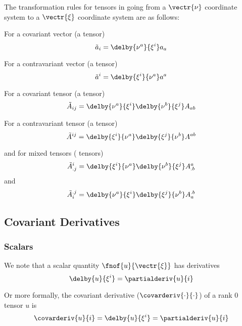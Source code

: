 The transformation rules for tensors in going from a $\vectr{\nu}$ coordinate
system to a $\vectr{\xi}$ coordinate system are as follows: 


For a covariant vector (a  tensor)
\begin{equation}
  {\tilde{a}}_{i}=\delby{\nu^{a}}{\xi^{i}}a_{a}
\end{equation}

For a contravariant vector (a  tensor)
\begin{equation}
  {\tilde{a}}^{i}=\delby{\xi^{i}}{\nu^{a}}a^{a}
\end{equation}

For a covariant tensor (a  tensor)
\begin{equation}
  {\tilde{A}}_{ij}=\delby{\nu^{a}}{\xi^{i}}\delby{\nu^{b}}{\xi^{j}}A_{ab} 
\end{equation}

For a contravariant tensor (a  tensor)
\begin{equation}
  {\tilde{A}}^{ij}=\delby{\xi^{i}}{\nu^{a}}\delby{\xi^{j}}{\nu^{b}}A^{ab}
\end{equation}

and for mixed tensors ( tensors)
\begin{equation}
  {\tilde{A}}^{i}_{.j}=\delby{\xi^{i}}{\nu^{a}}\delby{\nu^{b}}{\xi^{j}}A^{a}_{.b}
\end{equation}
and
\begin{equation}
  {\tilde{A}}_{i}^{.j}=\delby{\nu^{a}}{\xi^{i}}\delby{\xi^{j}}{\nu^{b}}A_{a}^{.b}
\end{equation}

\subsection{Covariant Derivatives}
\label{subsec:function derivatives}

\subsubsection{Scalars}

We note that a scalar quantity $\fnof{u}{\vectr{\xi}}$ has derivatives
\begin{equation}
  \delby{u}{\xi^{i}}=\partialderiv{u}{i}
\end{equation}

Or more formally, the covariant derivative ($\covarderiv{\cdot}{\cdot}$) of a
rank 0 tensor $u$ is
\begin{equation}
  \covarderiv{u}{i}=\delby{u}{\xi^{i}}=\partialderiv{u}{i}
\end{equation}

